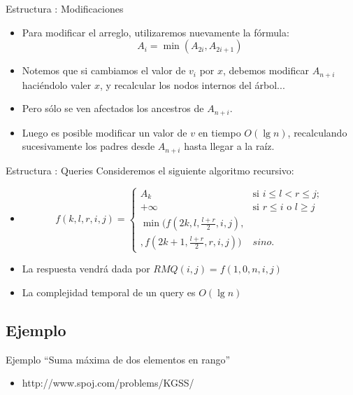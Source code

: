\documentclass{beamer}
\DeclareMathOperator*{\mimin}{min}
\begin{document}
\begin{frame}{Estructura : Modificaciones}
    \begin{itemize}
       \item Para modificar el arreglo, utilizaremos nuevamente la fórmula:
       $$A_i = \mimin(A_{2i},A_{2i+1})$$
       \item Notemos que si cambiamos el valor de $v_i$ por $x$, debemos modificar $A_{n+i}$ haciéndolo valer $x$, y recalcular
          los nodos internos del árbol...
       \item Pero sólo se ven afectados los ancestros de $A_{n+i}$.
       \item Luego es posible modificar un valor de $v$ en tiempo $O(\lg n)$, recalculando sucesivamente los padres desde $A_{n+i}$ hasta llegar a la raíz.
    \end{itemize}
\end{frame}


\begin{frame}{Estructura : Queries}
     Consideremos el siguiente algoritmo recursivo:
    \begin{itemize}
         \item $$f(k,l, r, i,j) = \left\{ \begin{array}{ll}
                                     A_k & \mbox{si $i \leq l < r \leq j$};\\
                                     +\infty & 
                                      \mbox{si $r \leq i$ o $l \geq j$} \\
                                     \mimin(f(2k,l,\frac{l+r}{2},i,j), & \\
                                     ,f(2k+1,\frac{l+r}{2},r,i,j))& sino.\end{array} \right.$$
         \item La respuesta vendrá dada por $RMQ(i,j) = f(1,0,n,i,j)$
         \item La complejidad temporal de un query es $O(\lg n)$
    \end{itemize}
\end{frame}

\subsection{Ejemplo}

\begin{frame}{Ejemplo}
    ``Suma máxima de dos elementos en rango''
    \begin{itemize}
         \item http://www.spoj.com/problems/KGSS/
    \end{itemize}
\end{frame}
\end{document}
